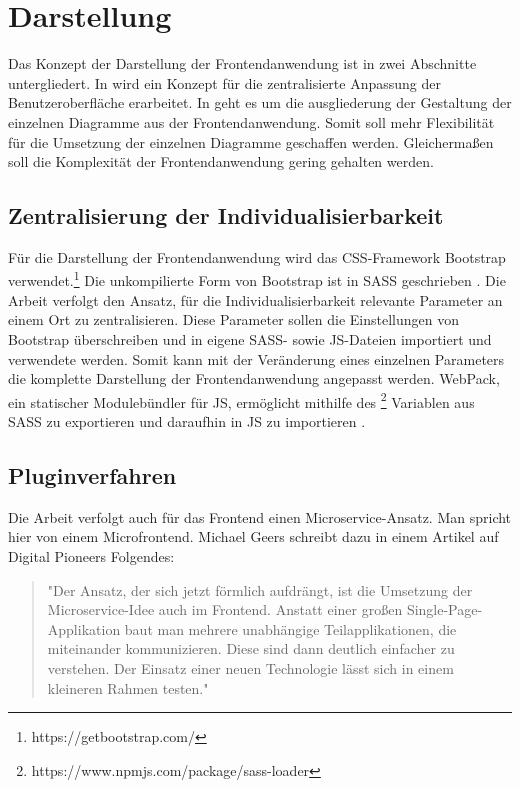 \section{Darstellung}
\label{sec:darstellung}
Das Konzept der Darstellung der Frontendanwendung ist in zwei Abschnitte untergliedert.
In  wird ein Konzept für die
zentralisierte Anpassung der Benutzeroberfläche erarbeitet. In 
geht es um die ausgliederung der Gestaltung der einzelnen Diagramme aus der Frontendanwendung.
Somit soll mehr Flexibilität für die Umsetzung der einzelnen Diagramme geschaffen werden.
Gleichermaßen soll die Komplexität der Frontendanwendung gering gehalten werden.

\subsection{Zentralisierung der Individualisierbarkeit}
\label{subsec:zentralisierungderindividualisierbarkeit}
Für die Darstellung der Frontendanwendung wird das CSS-Framework Bootstrap verwendet.\footnote{https://getbootstrap.com/}
Die unkompilierte Form von Bootstrap ist in SASS geschrieben \cite[2. Abschnitt]{Bootstrap4punkt4}.
Die Arbeit verfolgt den Ansatz, für die Individualisierbarkeit relevante Parameter an einem Ort
zu zentralisieren. Diese Parameter sollen die Einstellungen von Bootstrap überschreiben und
in eigene SASS- sowie JS-Dateien importiert und verwendete werden. Somit kann mit der Veränderung
eines einzelnen Parameters die komplette Darstellung der Frontendanwendung angepasst werden.
WebPack, ein statischer Modulebündler für JS, ermöglicht mithilfe des \footnote{https://www.npmjs.com/package/sass-loader} Variablen
aus SASS zu exportieren und daraufhin in JS zu importieren \cite{ShareSCSSwithJS}.

\subsection{Pluginverfahren}
\label{subsec:pluginverfahren}

Die Arbeit verfolgt auch für das Frontend einen Microservice-Ansatz. Man spricht hier von einem
Microfrontend. Michael Geers schreibt dazu in einem Artikel auf Digital Pioneers Folgendes:

\begin{quote}
"Der Ansatz, der sich jetzt förmlich aufdrängt, ist die Umsetzung der Microservice-Idee
auch im Frontend. Anstatt einer ­großen Single-Page-Applikation baut man mehrere unabhängige
Teilapplikationen, die miteinander kommunizieren. Diese sind dann deutlich einfacher zu verstehen.
Der Einsatz einer neuen Technologie lässt sich in einem kleineren Rahmen testen."\cite{MicrofrontendT3N}
\end{quote}

